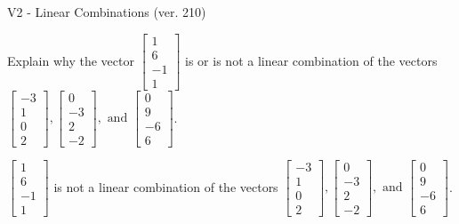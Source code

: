 \begin{exercise}
  \begin{exerciseTitle}V2 - Linear Combinations (ver. 210)\end{exerciseTitle}
  \begin{exerciseStatement}
    Explain why the vector \(\left[\begin{array}{c}
1 \\
6 \\
-1 \\
1
\end{array}\right]\)  is or is not a linear 
	combination of the vectors \(\left[\begin{array}{c}
-3 \\
1 \\
0 \\
2
\end{array}\right] , \left[\begin{array}{c}
0 \\
-3 \\
2 \\
-2
\end{array}\right] , \text{ and } \left[\begin{array}{c}
0 \\
9 \\
-6 \\
6
\end{array}\right]\).
	


  \end{exerciseStatement}
  \begin{exerciseAnswer}
   \(\left[\begin{array}{c}
1 \\
6 \\
-1 \\
1
\end{array}\right]\) 
  	 is not  
	a linear combination of the vectors \(\left[\begin{array}{c}
-3 \\
1 \\
0 \\
2
\end{array}\right] , \left[\begin{array}{c}
0 \\
-3 \\
2 \\
-2
\end{array}\right] , \text{ and } \left[\begin{array}{c}
0 \\
9 \\
-6 \\
6
\end{array}\right]\).

	
  


  \end{exerciseAnswer}
\end{exercise}